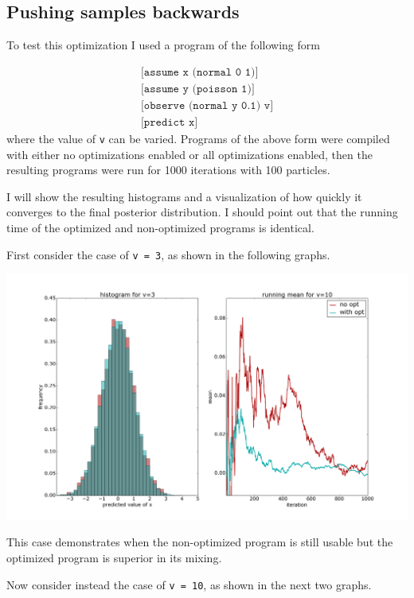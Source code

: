 \documentclass[a4paper]{article}
\begin{document}
\subsection{Pushing samples backwards}

To test this optimization I used a program of the following form

\[
	\begin{array}{l}
		\texttt{[assume x (normal 0 1)]} \\
		\texttt{[assume y (poisson 1)]} \\
		\texttt{[observe (normal y 0.1) v]} \\
		\texttt{[predict x]}
	\end{array}
\]
where the value of \texttt{v} can be varied. Programs of the above form were compiled with either no optimizations enabled or all optimizations enabled, then the resulting programs were run for 1000 iterations with 100 particles.

I will show the resulting histograms and a visualization of how quickly it converges to the final posterior distribution. I should point out that the running time of the optimized and non-optimized programs is identical.

First consider the case of \texttt{v = 3}, as shown in the following graphs.

\centerline{\includegraphics[width=16cm]{images/pushing_samples_back_1.png}}

This case demonstrates when the non-optimized program is still usable but the optimized program is superior in its mixing.

Now consider instead the case of \texttt{v = 10}, as shown in the next two graphs.
\end{document}
